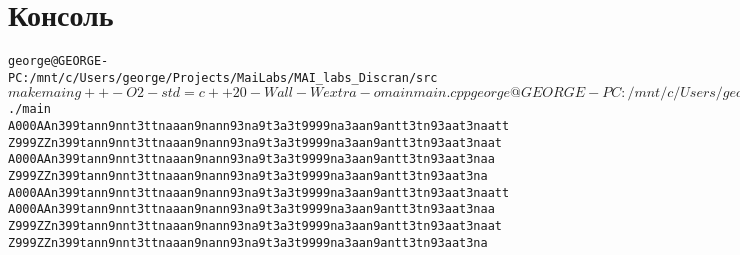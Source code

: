 \section{Консоль}
\begin{alltt}
george@GEORGE-PC:/mnt/c/Users/george/Projects/MaiLabs/MAI_labs_Discran/src$ make main
g++ -O2 -std=c++20 -Wall -Wextra -o main main.cpp
george@GEORGE-PC:/mnt/c/Users/george/Projects/MaiLabs/MAI_labs_Discran/src$ ./main
A 000 AA        n399tann9nnt3ttnaaan9nann93na9t3a3t9999na3aan9antt3tn93aat3naatt
Z 999 ZZ        n399tann9nnt3ttnaaan9nann93na9t3a3t9999na3aan9antt3tn93aat3naat
A 000 AA        n399tann9nnt3ttnaaan9nann93na9t3a3t9999na3aan9antt3tn93aat3naa
Z 999 ZZ        n399tann9nnt3ttnaaan9nann93na9t3a3t9999na3aan9antt3tn93aat3na
A 000 AA        n399tann9nnt3ttnaaan9nann93na9t3a3t9999na3aan9antt3tn93aat3naatt
A 000 AA        n399tann9nnt3ttnaaan9nann93na9t3a3t9999na3aan9antt3tn93aat3naa
Z 999 ZZ        n399tann9nnt3ttnaaan9nann93na9t3a3t9999na3aan9antt3tn93aat3naat
Z 999 ZZ        n399tann9nnt3ttnaaan9nann93na9t3a3t9999na3aan9antt3tn93aat3na
\end{alltt}
\pagebreak

